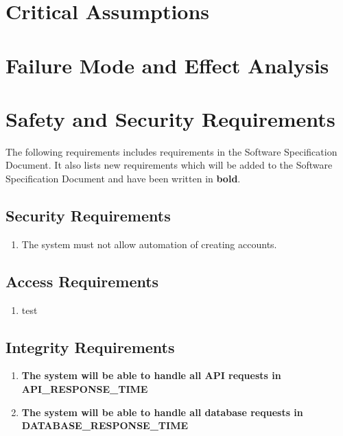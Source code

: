 \documentclass{article}
\begin{document}
\section{Critical Assumptions}


\section{Failure Mode and Effect Analysis}


\section{Safety and Security Requirements}

The following requirements includes requirements in the Software Specification Document. It also lists new requirements which will be added to the Software Specification Document and have been written in \textbf{bold}. 
\subsection{Security Requirements}
\begin{enumerate}[{SR}1. ]
    \item The system must not allow automation of creating accounts. 
\end{enumerate}
\subsection{Access Requirements}
\begin{enumerate}[{ACR}1. ]
    \item test
\end{enumerate}
\subsection{Integrity Requirements}
\begin{enumerate}[{IR}1. ]
    \item \textbf{The system will be able to handle all API requests in API\_RESPONSE\_TIME}
    \item \textbf{The system will be able to handle all database requests in DATABASE\_RESPONSE\_TIME}
\end{enumerate}
\end{document}

